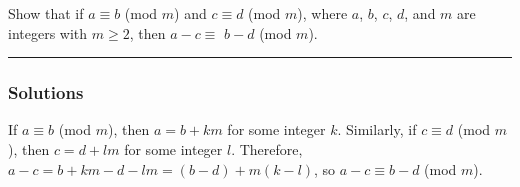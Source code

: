 \begin{question}
Show that if $a \equiv b$ (mod $m$) and $c \equiv d$ (mod $m$), where $a$, $b$, $c$, $d$, and $m$ are integers with $m \geq 2$, then $a-c \equiv$ $b-d$ (mod $m$).
\end{question}

\par\noindent\rule{\textwidth}{0.5pt}

\subsubsection*{Solutions}
\indent\indent
If $a \equiv b$ (mod $m$), then $a = b + km$ for some integer $k$. Similarly, if $c \equiv d$ (mod $m$), then $c = d + lm$ for some integer $l$. Therefore, $a - c = b + km - d - lm = (b - d) + m(k - l)$, so $a - c \equiv b - d$ (mod $m$).